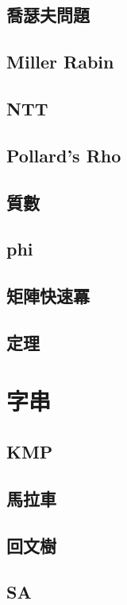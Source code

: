 \documentclass[a4paper,10pt,twocolumn,oneside]{article}
\begin{document}
\subsection{喬瑟夫問題}

\subsection{Miller Rabin}

\subsection{NTT}

\subsection{Pollard's Rho}

\subsection{質數}

\subsection{phi}

\subsection{矩陣快速冪}

\subsection{定理}

\section{字串}
\subsection{KMP}

\subsection{馬拉車}

\subsection{回文樹}

\subsection{SA}

\end{document}
